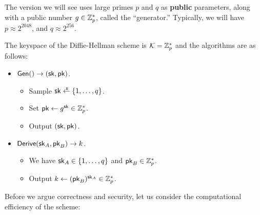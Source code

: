 The version we will see uses large primes $p$ 
and $q$ as \textbf{public} parameters, along with a public number $g \in \mathbb{Z}^*_p$,
called the ``generator.''
Typically, we will have $p \approx 2^{2048}$, and $q \approx 2^{256}$.

The keyspace of the Diffie-Hellman scheme is $\mathcal{K} = \mathbb{Z}^*_p$
and the algorithms are as follows:
\begin{itemize}[noitemsep]
  \item $\mathsf{Gen}() \to ({\mathsf{sk}}, \mathsf{pk})$.
    \begin{itemize}[noitemsep]
      \item Sample $\sk \getsr \{1, \dots, q\}$.
      \item Set $\mathsf{pk} \gets g^{{\mathsf{sk}}} \in \mathbb{Z}^*_p$.
      \item Output $({\mathsf{sk}}, \mathsf{pk})$.
    \end{itemize}

  \item $\mathsf{Derive}({\mathsf{sk}}_A, \mathsf{pk}_B) \to k$.
    \begin{itemize}[noitemsep]
      \item We have ${\mathsf{sk}}_A \in \{1, \dots, q\}$ and $\mathsf{pk}_B \in \mathbb{Z}^*_p$.
      \item Output $k \gets (\mathsf{pk}_B)^{{\mathsf{sk}}_A} \in \mathbb{Z}^*_p$.
    \end{itemize}
\end{itemize}

Before we argue correctness and security, let us consider
the computational efficiency of the scheme:

